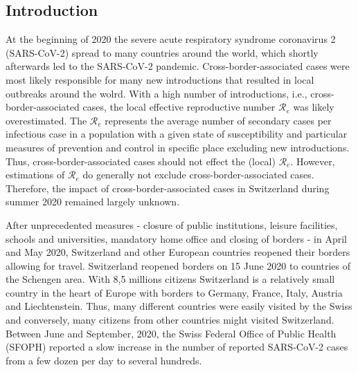 \documentclass[10pt, a4paper, twoside]{article}
\begin{document}
\begin{multicols}{2}
\section{Introduction}

\lhead{ }
At the beginning of 2020 the severe acute respiratory syndrome coronavirus 2 (SARS-CoV-2) spread to many countries around the world, which shortly afterwards led to the SARS-CoV-2 pandemic.\cite{worobey_emergence_2020}
Cross-border-associated cases were most likely responsible for many new introductions that resulted in local outbreaks around the wolrd.\cite{russell_effect_2021}
With a high number of introductions, i.e., cross-border-associated cases, the local effective reproductive number $\mathcal{R}_e$ was likely overestimated.\cite{roberts_early_2011}
The $\mathcal{R}_e$ represents the average number of secondary cases per infectious case in a population with a given state of susceptibility and particular measures of prevention and control in specific place excluding new introductions.
Thus, cross-border-associated cases should not effect the (local) $\mathcal{R}_e$.
However, estimations of $\mathcal{R}_e$ do generally not exclude cross-border-associated cases.
Therefore, the impact of cross-border-associated cases in Switzerland during summer 2020 remained largely unknown.

After unprecedented measures - closure of public institutions, leisure facilities, schools and universities, mandatory home office and closing of borders -  in April and May 2020, Switzerland and other European countries reopened their borders allowing for travel.
Switzerland reopened borders on 15 June 2020 to countries of the Schengen area.\cite{federal_council_coronavirus_2020}
With 8,5 millions citizens Switzerland is a relatively small country in the heart of Europe with borders to Germany, France, Italy, Austria and Liechtenstein.
Thus, many different countries were easily visited by the Swiss and conversely, many citizens from other countries might visited Switzerland.
Between June and September, 2020, the Swiss Federal Office of Public Health (SFOPH) reported a slow increase in the number of reported SARS-CoV-2 cases from a few dozen per day to several hundreds.


\end{multicols}
\end{document}
